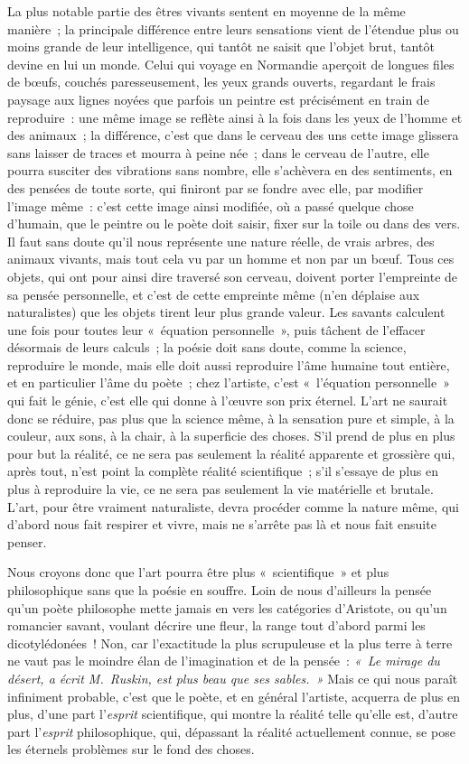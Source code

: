 \documentclass[french,twoside]{book} %
\begin{document}
La plus notable partie des êtres vivants sentent en moyenne de la même manière ; la principale différence entre leurs sensations vient de l’étendue plus ou moins grande de leur intelligence, qui tantôt ne saisit que l’objet brut, tantôt devine en lui un monde. Celui qui voyage en Normandie aperçoit de longues files de bœufs, couchés paresseusement, les yeux grands ouverts, regardant le frais paysage aux lignes noyées que parfois un peintre est précisément en train de reproduire : une même image se reflète ainsi à la fois dans les yeux de l’homme et des animaux ; la différence, c’est que dans le cerveau des uns cette image glissera sans  laisser de traces et mourra à peine née ; dans le cerveau de l’autre, elle pourra susciter des vibrations sans nombre, elle s’achèvera en des sentiments, en des pensées de toute sorte, qui finiront par se fondre avec elle, par modifier l’image même : c’est cette image ainsi modifiée, où a passé quelque chose d’humain, que le peintre ou le poète doit saisir, fixer sur la toile ou dans des vers. Il faut sans doute qu’il nous représente une nature réelle, de vrais arbres, des animaux vivants, mais tout cela vu par un homme et non par un bœuf. Tous ces objets, qui ont pour ainsi dire traversé son cerveau, doivent porter l’empreinte de sa pensée personnelle, et c’est de cette empreinte même (n’en déplaise aux naturalistes) que les objets tirent leur plus grande valeur. Les savants calculent une fois pour toutes leur « équation personnelle », puis tâchent de l’effacer désormais de leurs calculs ; la poésie doit sans doute, comme la science, reproduire le monde, mais elle doit aussi reproduire l’âme humaine tout entière, et en particulier l’âme du poète ; chez l’artiste, c’est « l’équation personnelle » qui fait le génie, c’est elle qui donne à l’œuvre son prix éternel. L’art ne saurait donc se réduire, pas plus que la science même, à la sensation pure et simple, à la couleur, aux sons, à la chair, à la superficie des choses. S’il prend de plus en plus pour but la réalité, ce ne sera pas seulement la réalité apparente et grossière qui, après tout, n’est point la complète réalité scientifique ; s’il s’essaye de plus en plus à reproduire la vie, ce ne sera pas seulement la vie matérielle et brutale. L’art, pour être vraiment naturaliste, devra procéder comme la nature même, qui d’abord  nous fait respirer et vivre, mais ne s’arrête pas là et nous fait ensuite penser.\par
Nous croyons donc que l’art pourra être plus « scientifique » et plus philosophique sans que la poésie en souffre. Loin de nous d’ailleurs la pensée qu’un poète philosophe mette jamais en vers les catégories d’Aristote, ou qu’un romancier savant, voulant décrire une fleur, la range tout d’abord parmi les dicotylédonées ! Non, car l’exactitude la plus scrupuleuse et la plus terre à terre ne vaut pas le moindre élan de l’imagination et de la pensée : \emph{« Le mirage du désert, a écrit M. Ruskin, est plus beau que ses sables. »} Mais ce qui nous paraît infiniment probable, c’est que le poète, et en général l’artiste, acquerra de plus en plus, d’une part l’\emph{esprit} scientifique, qui montre la réalité telle qu’elle est, d’autre part l’\emph{esprit} philosophique, qui, dépassant la réalité actuellement connue, se pose les éternels problèmes sur le fond des choses.\par
\end{document}

